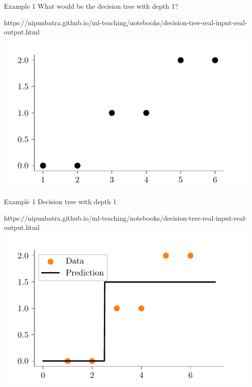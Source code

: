 \documentclass[usenames,dvipsnames]{beamer}
\begin{document}
\begin{frame}{Example 1}
What would be the decision tree with depth 1?
\begin{center}
	\begin{notebookbox}{https://nipunbatra.github.io/ml-teaching/notebooks/decision-tree-real-input-real-output.html}
		\includegraphics{../assets/decision-trees/figures/ri-ro-dataset.pdf}
	  \end{notebookbox}
\end{center}
\end{frame}

\begin{frame}{Example 1}
Decision tree with depth 1
\begin{center}
	\begin{notebookbox}{https://nipunbatra.github.io/ml-teaching/notebooks/decision-tree-real-input-real-output.html}
		\includegraphics{../assets/decision-trees/figures/ri-ro-depth-1.pdf}
	\end{notebookbox}	
\end{center}
\end{frame}
\end{document}
